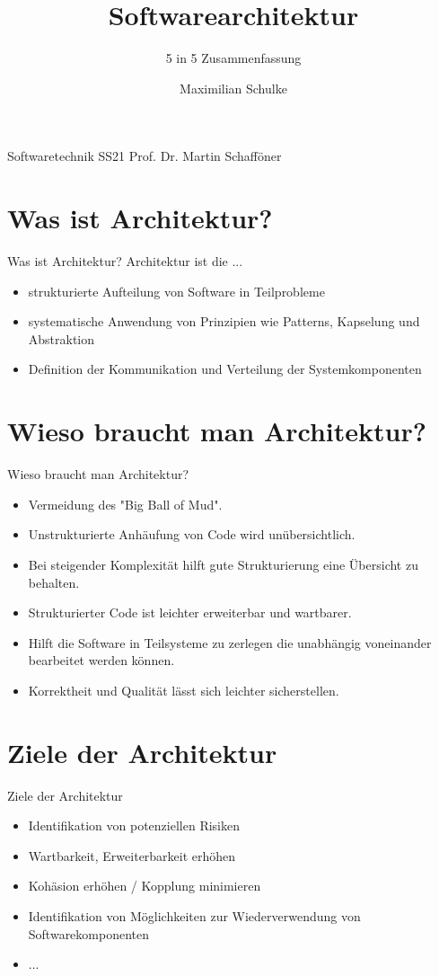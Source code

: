 \documentclass{beamer}
\title{Softwarearchitektur}
\subtitle{5 in 5 Zusammenfassung}
\author{Maximilian Schulke}
\begin{document}
\begin{frame}
	Softwaretechnik \hfill SS21
	\titlepage
	Prof. Dr. Martin Schafföner
\end{frame}

\section{Was ist Architektur?}

\begin{frame}{Was ist Architektur?}
	Architektur ist die ...
	\begin{itemize}
		\item{strukturierte Aufteilung von Software in Teilprobleme}
		\item{systematische Anwendung von Prinzipien wie Patterns, Kapselung und
			Abstraktion}
		\item{Definition der Kommunikation und Verteilung der
			Systemkomponenten}
	\end{itemize}
\end{frame}

\section{Wieso braucht man Architektur?}

\begin{frame}{Wieso braucht man Architektur?}
	\begin{itemize}
		\item{Vermeidung des "Big Ball of Mud".}
		\item{Unstrukturierte Anhäufung von Code wird unübersichtlich.}
		\item{Bei steigender Komplexität hilft gute Strukturierung eine
			Übersicht zu behalten.}
		\item{Strukturierter Code ist leichter erweiterbar und wartbarer.}
		\item{Hilft die Software in Teilsysteme zu zerlegen die unabhängig
			voneinander bearbeitet werden können.}
		\item{Korrektheit und Qualität lässt sich leichter sicherstellen.}
	\end{itemize}
\end{frame}

\section{Ziele der Architektur}

\begin{frame}{Ziele der Architektur}
	\begin{itemize}
		\item{Identifikation von potenziellen Risiken}
		\item{Wartbarkeit, Erweiterbarkeit erhöhen}
		\item{Kohäsion erhöhen / Kopplung minimieren}
		\item{Identifikation von Möglichkeiten zur Wiederverwendung von
			Softwarekomponenten}
		\item{...}
	\end{itemize}
\end{frame}
\end{document}
